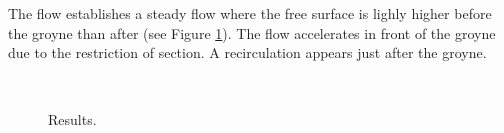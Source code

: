 The flow establishes a steady flow where the free
surface is lighly higher before the groyne than after
(see Figure \ref{t3d:particles:results}).
The flow accelerates in front of the groyne due to the restriction of section.
A recirculation appears just after the groyne.

\begin{figure}[H]
  \centering
   \\
  \caption{Results.}\label{t3d:particles:results}
\end{figure}

